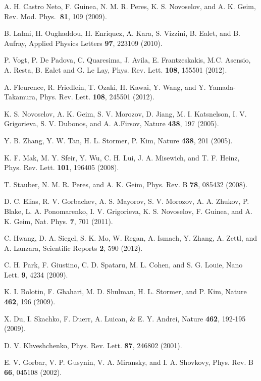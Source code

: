 \documentclass[reprint, superscriptaddress,  aps, pra]{revtex4-2}
\begin{document}
\begin{thebibliography}{99}
 A. H. Castro Neto, F. Guinea, N. M. R. Peres, K. S.
Novoselov, and A. K. Geim, Rev. Mod. Phys.\textbf{\ 81}, 109 (2009).

 B. Lalmi, H. Oughaddou, H. Enriquez, A. Kara, S. Vizzini, B.
Ealet, and B. Aufray, Applied Physics Letters \textbf{97}, 223109 (2010).

 P. Vogt, P. De Padova, C. Quaresima, J. Avila, E.
Frantzeskakis, M.C. Asensio, A. Resta, B. Ealet and G. Le Lay, Phys. Rev.
Lett. \textbf{108}, 155501 (2012).

 A. Fleurence, R. Friedlein, T. Ozaki, H. Kawai, Y. Wang, and
Y. Yamada-Takamura, Phys. Rev. Lett. \textbf{108}, 245501 (2012).

 K. S. Novoselov, A. K. Geim, S. V. Morozov, D. Jiang, M.
I. Katsnelson, I. V. Grigorieva, S. V. Dubonos, and A. A.Firsov, Nature 
\textbf{438}, 197 (2005).

 Y. B. Zhang, Y. W. Tan, H. L. Stormer, P. Kim, Nature 
\textbf{438}, 201 (2005).

 K. F. Mak, M. Y. Sfeir, Y. Wu, C. H. Lui, J. A. Misewich, and
T. F. Heinz, Phys. Rev. Lett. \textbf{101}, 196405 (2008).

 T. Stauber, N. M. R. Peres, and A. K. Geim, Phys. Rev. B 
\textbf{78}, 085432 (2008).

 D. C. Elias, R. V. Gorbachev, A. S. Mayorov, S. V. Morozov,
A. A. Zhukov, P. Blake, L. A. Ponomarenko, I. V. Grigorieva, K. S.
Novoselov, F. Guinea, and A. K. Geim, Nat. Phys. \textbf{7}, 701 (2011).

 C. Hwang, D. A. Siegel, S. K. Mo, W. Regan, A. Ismach, Y.
Zhang, A. Zettl, and A. Lanzara, Scientific Reports \textbf{2}, 590 (2012).

 C. H. Park, F. Giustino, C. D. Spataru, M. L. Cohen, and S.
G. Louie, Nano Lett. \textbf{9}, 4234 (2009).

 K. I. Bolotin, F. Ghahari, M. D. Shulman, H. L. Stormer,
and P. Kim, Nature \textbf{462}, 196 (2009).

 X. Du, I. Skachko, F. Duerr, A. Luican, \& E. Y. Andrei,
Nature \textbf{462}, 192-195 (2009).

 D. V. Khveshchenko, Phys. Rev. Lett. \textbf{87},
246802 (2001).

 E. V. Gorbar, V. P. Gusynin, V. A. Miransky, and I. A.
Shovkovy, Phys. Rev. B \textbf{66}, 045108 (2002).


\end{thebibliography}
\end{document}

